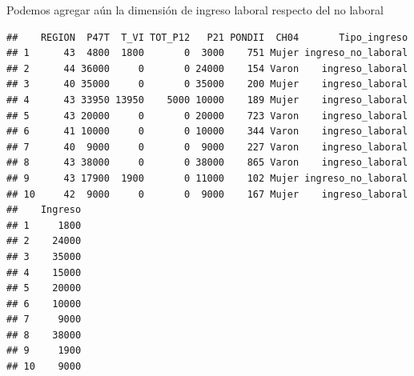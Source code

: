 \documentclass[]{book}
\newenvironment{Shaded}{\begin{snugshade}}{\end{snugshade}}
\newcommand{\CommentTok}[1]{\textcolor[rgb]{0.56,0.35,0.01}{\textit{#1}}}
\newcommand{\DataTypeTok}[1]{\textcolor[rgb]{0.13,0.29,0.53}{#1}}
\newcommand{\DecValTok}[1]{\textcolor[rgb]{0.00,0.00,0.81}{#1}}
\newcommand{\KeywordTok}[1]{\textcolor[rgb]{0.13,0.29,0.53}{\textbf{#1}}}
\newcommand{\NormalTok}[1]{#1}
\newcommand{\OperatorTok}[1]{\textcolor[rgb]{0.81,0.36,0.00}{\textbf{#1}}}
\newcommand{\StringTok}[1]{\textcolor[rgb]{0.31,0.60,0.02}{#1}}
\begin{document}
Podemos agregar aún la dimensión de ingreso laboral respecto del no laboral

\begin{Shaded}
\end{Shaded}

\begin{verbatim}
##    REGION  P47T  T_VI TOT_P12   P21 PONDII  CH04       Tipo_ingreso
## 1      43  4800  1800       0  3000    751 Mujer ingreso_no_laboral
## 2      44 36000     0       0 24000    154 Varon    ingreso_laboral
## 3      40 35000     0       0 35000    200 Mujer    ingreso_laboral
## 4      43 33950 13950    5000 10000    189 Mujer    ingreso_laboral
## 5      43 20000     0       0 20000    723 Varon    ingreso_laboral
## 6      41 10000     0       0 10000    344 Varon    ingreso_laboral
## 7      40  9000     0       0  9000    227 Varon    ingreso_laboral
## 8      43 38000     0       0 38000    865 Varon    ingreso_laboral
## 9      43 17900  1900       0 11000    102 Mujer ingreso_no_laboral
## 10     42  9000     0       0  9000    167 Mujer    ingreso_laboral
##    Ingreso
## 1     1800
## 2    24000
## 3    35000
## 4    15000
## 5    20000
## 6    10000
## 7     9000
## 8    38000
## 9     1900
## 10    9000
\end{verbatim}
\end{document}
